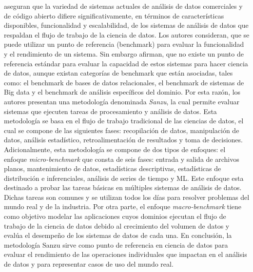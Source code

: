 \citep{Watson2017} aseguran que la variedad de sistemas actuales de análisis de datos comerciales y de código abierto difiere significativamente, en términos de características disponibles, funcionalidad y escalabilidad, de los sistemas de análisis de datos que respaldan el flujo de trabajo de la ciencia de datos. Los autores consideran, que se puede utilizar un punto de referencia (benchmark) para evaluar la funcionalidad y el rendimiento de un sistema. Sin embargo afirman, que no existe un punto de referencia estándar para evaluar la capacidad de estos sistemas para hacer ciencia de datos, aunque existan categorías de benchmark que están asociadas, tales como: el benchmark de bases de datos relacionales, el benchmark de sistemas de Big data y el benchmark de análisis específicos del dominio. Por esta razón, los autores presentan una metodología denominada \textit{Sanzu}, la cual permite evaluar sistemas que ejecuten tareas de procesamiento y análisis de datos. Esta metodología se basa en el flujo de trabajo tradicional de las ciencias de datos, el cual se compone de las siguientes fases: recopilación de datos, manipulación de datos, análisis estadístico, retroalimentación  de resultados y toma de decisiones. Adicionalmente, esta metodología se compone de dos tipos de enfoques: el enfoque \textit{micro-benchmark} que consta de seis fases: entrada y salida de archivos planos, mantenimiento de datos, estadísticas descriptivas, estadísticas de distribución e inferenciales, análisis de series de tiempo y ML. Este enfoque esta destinado a probar las tareas básicas en múltiples sistemas de análisis de datos. Dichas tareas son comunes y se utilizan todos los días para resolver problemas del mundo real y de la industria. Por otra parte, el enfoque \textit{macro-benchmark} tiene como objetivo modelar las aplicaciones cuyos dominios ejecutan el flujo de trabajo de la ciencia de datos debido al crecimiento del volumen de datos y evalúa el desempeño de los sistemas de datos de cada una. En conclusión, la metodología Sanzu sirve como punto de referencia en ciencia de datos para evaluar el rendimiento de las operaciones individuales que impactan en el análisis de datos y para representar casos de uso del mundo real.

